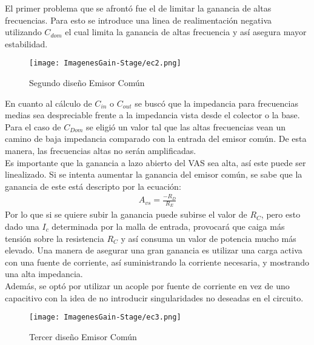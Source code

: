 El primer problema que se afrontó fue el de limitar la ganancia de altas frecuencias.
Para esto se introduce una linea de realimentación negativa utilizando $C_{dom}$ el cual limita la ganancia de altas frecuencia y así asegura mayor estabilidad.
 \begin{figure}[H]
\centering
	\texttt{[image: ImagenesGain-Stage/ec2.png]}
	\caption{Segundo diseño Emisor Común}
	\label{fig:ec2}
\end{figure}
En cuanto al cálculo de $C_{in}$ o $C_{out}$ se buscó que la impedancia para frecuencias medias sea despreciable frente a la impedancia vista desde el colector o la base.\\
Para el caso de $C_{Dom}$ se eligió un valor tal que las altas frecuencias vean un camino de baja impedancia comparado con la entrada del emisor común. De esta manera, las frecuencias altas no serán amplificadas.\\
Es importante que la ganancia a lazo abierto del VAS sea alta, así este puede ser linealizado. Si se intenta aumentar la ganancia del emisor común, se sabe que la ganancia de este está descripto por la ecuación:
\begin{align}
A_{vs}=\frac{-R_D}{R_E}
\end{align}
Por lo que si se quiere subir la ganancia puede subirse el valor de $R_C$, pero esto dado una $I_c$ determinada por la  malla de entrada, provocará que caiga más tensión sobre la resistencia $R_C$ y así consuma un valor de potencia mucho más elevado. Una manera de asegurar una gran ganancia es utilizar una carga activa con una fuente de corriente, así suministrando la corriente necesaria, y mostrando una alta impedancia. \\
Además, se optó por utilizar un acople por fuente de corriente en vez de uno capacitivo con la idea de no introducir singularidades no deseadas en el circuito.
 \begin{figure}[H]
\centering
	\texttt{[image: ImagenesGain-Stage/ec3.png]}
	\caption{Tercer diseño Emisor Común}
	\label{fig:ec3}
\end{figure}

